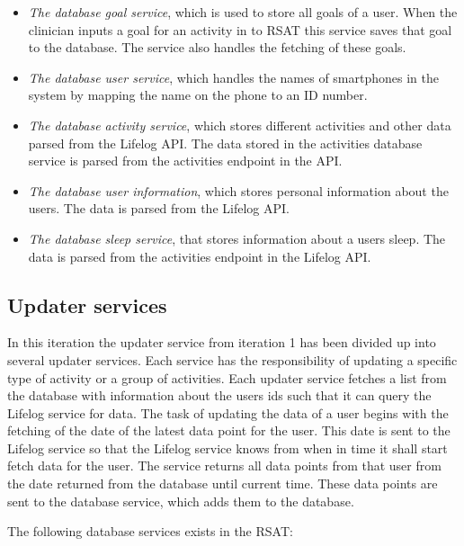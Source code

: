 \documentclass{cslthse-msc}
\begin{document}
\begin{itemize}
\item \emph{The database goal service}, which is used to store all goals of a user. When the clinician inputs a goal for an activity in to RSAT this service saves that goal to the database. The service also handles the fetching of these goals. 

\item \emph{The database user service}, which handles the names of smartphones in the system by mapping the name on the phone to an ID number. %

\item \emph{The database activity service}, which stores different activities and other data parsed from the Lifelog API. The data stored in the activities database service is parsed from the activities endpoint in the API. 

\item \emph{The database user information}, which stores personal information about the users. The data is parsed from the Lifelog API.

\item \emph{The database sleep service}, that stores information about a users sleep. The data is parsed from the activities endpoint in the Lifelog API.
\end{itemize}

\subsection{Updater services}

In this iteration the updater service from iteration 1 has been divided up into several updater services. Each service has the responsibility of updating a specific type of activity or a group of activities. Each updater service fetches a list from the database with information about the users ids such that it can query the Lifelog service for data. The task of updating the data of a user begins with the fetching of the date of the latest data point for the user. This date is sent to the Lifelog service so that the Lifelog service knows from when in time it shall start fetch data for the user. The service returns all data points from that user from the date returned from the database until current time. These data points are sent to the database service, which adds them to the database. 

The following database services exists in the RSAT:
\end{document}
